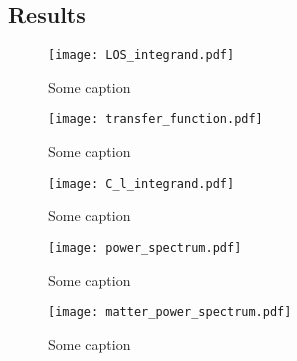 \subsection{Results}\label{sec:m4:results}


    \begin{figure}
        \texttt{[image: LOS\_integrand.pdf]}
        \caption{Some caption}
        \label{fig:m3:some}
    \end{figure}

    \begin{figure}
        \texttt{[image: transfer\_function.pdf]}
        \caption{Some caption}
        \label{fig:m3:some}
    \end{figure}

    \begin{figure}
        \texttt{[image: C\_l\_integrand.pdf]}
        \caption{Some caption}
        \label{fig:m3:some}
    \end{figure}

    \begin{figure}
        \texttt{[image: power\_spectrum.pdf]}
        \caption{Some caption}
        \label{fig:m3:some}
    \end{figure}

    \begin{figure}
        \texttt{[image: matter\_power\_spectrum.pdf]}
        \caption{Some caption}
        \label{fig:m3:some}
    \end{figure}